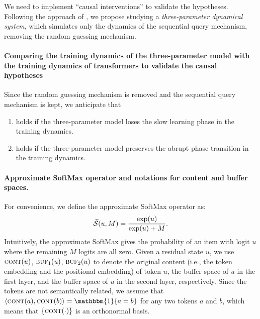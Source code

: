 We need to implement ``causal interventions'' to validate the hypotheses. Following the approach of \citet{reddy2023mechanistic}, we propose studying a \textit{three-parameter dynamical system}, which simulates only the dynamics of the sequential query mechanism, removing the random guessing mechanism.

\paragraph{Comparing the training dynamics of the three-parameter model with the training dynamics of transformers to validate the causal hypotheses}
Since the random guessing mechanism is removed and the sequential query mechanism is kept, we anticipate that
\begin{enumerate}
    \item {} holds if the three-parameter model loses the slow learning phase in the training dynamics.
    \item {} holds if the three-parameter model preserves the abrupt phase transition in the training dynamics.
\end{enumerate}

\paragraph{Approximate SoftMax operator and notations for content and buffer spaces.} For convenience, we define the approximate SoftMax operator as:
\[
\widetilde{\mathcal{S}}(u, M) = \frac{\exp(u)}{\exp(u)+M}.
\]
Intuitively, the approximate SoftMax gives the probability of an item with logit $u$ where the remaining $M$ logits are all zero. 
Given a residual state $u$, we use $\textsc{cont}(u)$, $\textsc{buf}_1(u)$, $\textsc{buf}_2(u)$ to denote the original content (i.e., the token embedding and the positional embedding) of token $u$, the buffer space of $u$ in the first layer, and the buffer space of $u$ in the second layer, respectively. Since the tokens are not semantically related, we assume that $\langle\content(a),\content(b)\rangle = \mathbbm{1}\{a=b\}$ for any two tokens $a$ and $b$, which means that $\{\textsc{cont}(\cdot)\}$ is an orthonormal basis. 

